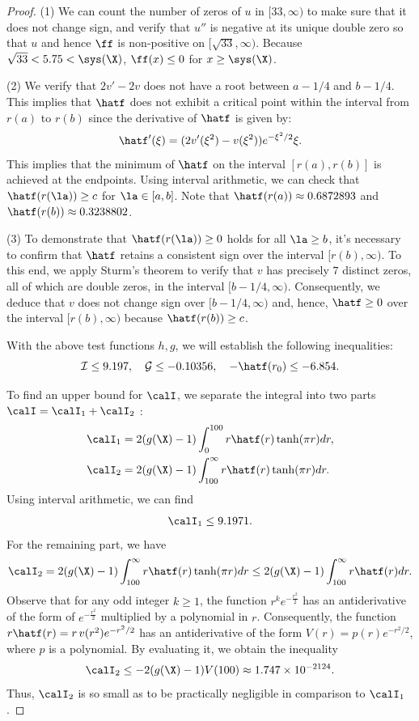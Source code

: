 \begin{proof}
(1) 
We can count the number of zeros of $u$ in $[33, \infty)$ to make sure that it does not change sign, and verify that $u''$ is negative at its unique double zero so that $u$ and hence $\ff$ is non-positive on $[\sqrt{33},\infty)$.
Because $\sqrt{33}<5.75<\sys(\X)$, $\ff(x)\leq 0$ for $x \geq \sys(\X)$.

(2)
We verify that \(2v'-2v\) does not have a root between \(a-1/4\) and \(b-1/4\).
This implies that \(\hatf\) does not exhibit a critical point within the interval from \(r(a)\) to \(r(b)\) since the derivative of \(\hatf\) is given by:
\[
\hatf'(\xi) = (2v'(\xi^2)-v(\xi^2)) e^{-\xi^2/2} \xi.
\]
This implies that the minimum of $\hatf$ on the interval $[r(a),r(b)]$ is achieved at the endpoints. 
Using interval arithmetic, we can check that $\hatf(r(\la)) \geq  c$ for $\la\in [a, b]$.
Note that 
$\hatf(r(a)) \approx 0.6872893$ and $\hatf(r(b)) \approx 0.3238802$.

(3)
To demonstrate that \(\hatf(r(\la)) \geq 0\) holds for all \(\la \geq b\), it's necessary to confirm that \(\hatf\) retains a consistent sign over the interval \([r(b), \infty)\).
To this end, we apply Sturm's theorem to verify that \(v\) has precisely \(7\) distinct zeros, all of which are double zeros, in the interval \([b-1/4,\infty)\). 
Consequently, we deduce that \(v\) does not change sign over \([b-1/4,\infty)\) and, hence, \(\hatf\geq 0 \) over the interval \([r(b),\infty)\) because \(\hatf(r(b)) \geq c\).

With the above test functions $h,g$, we will establish the following inequalities:
\[
\mathcal{I} \leq 9.197, \quad \mathcal{G} \leq -0.10356, \quad -\hatf(r_0) \leq -6.854.
\]

To find an upper bound for $\calI$,
we separate the integral into two parts $\calI = \calI_1+\calI_2$ :
\begin{align*}
\calI_1 & = 2(g(\X)-1) \int_0^{100} r \hatf(r) \tanh(\pi r) dr,\\
\calI_2 & = 2(g(\X)-1) \int_{100}^\infty r \hatf(r) \tanh(\pi r) dr.
\end{align*}
Using interval arithmetic, we can find
\[
\calI_1 \leq 9.1971.
\]
For the remaining part, we have
\[
\calI_2 = 2(g(\X)-1) \int_{100}^\infty r \hatf(r) \tanh(\pi r) dr\leq 2(g(\X)-1) \int_{100}^\infty r \hatf(r)dr.
\]
Observe that for any odd integer $k\geq 1$, the function $r^k e^{-\frac{r^2}{2}}$ has an antiderivative of the form of $e^{-\frac{r^2}{2}}$ multiplied by a polynomial in $r$. 
Consequently, the function $r \hatf(r) = r \, v(r^2) e^{-r^2/2}$ has an antiderivative of the form $V(r) = p(r)e^{-r^2/2}$, where $p$ is a polynomial.
By evaluating it, we obtain the inequality
\[
\calI_2 \leq -2(g(\X)-1)V(100) \approx 1.747\times 10^{-2124}.
\]
Thus, $\calI_2$ is so small as to be practically negligible in comparison to $\calI_1$.


\end{proof}
